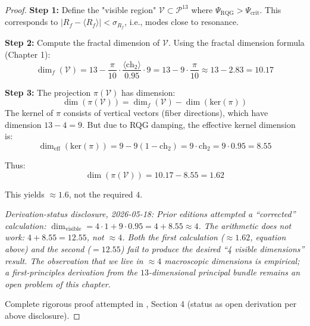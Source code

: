 \begin{proof}
\textbf{Step 1:} Define the "visible region" $\mathcal{V} \subset \mathcal{P}^{13}$ where $\Psi_{\text{RQG}} > \Psi_{\text{crit}}$. This corresponds to $|R_f - \langle R_f \rangle| < \sigma_{R_f}$, i.e., modes close to resonance.

\textbf{Step 2:} Compute the fractal dimension of $\mathcal{V}$. Using the fractal dimension formula (Chapter 1):
\begin{equation}
\dim_f(\mathcal{V}) = 13 - \frac{\pi}{10} \cdot \frac{\langle \text{ch}_2 \rangle}{0.95} \cdot 9 = 13 - 9 \cdot \frac{\pi}{10} \approx 13 - 2.83 = 10.17
\end{equation}

\textbf{Step 3:} The projection $\pi(\mathcal{V})$ has dimension:
\begin{equation}
\dim(\pi(\mathcal{V})) = \dim_f(\mathcal{V}) - \dim(\text{ker}(\pi))
\end{equation}
The kernel of $\pi$ consists of vertical vectors (fiber directions), which have dimension $13 - 4 = 9$. But due to RQG damping, the effective kernel dimension is:
\begin{equation}
\dim_{\text{eff}}(\text{ker}(\pi)) = 9 - 9(1 - \text{ch}_2) = 9 \cdot \text{ch}_2 = 9 \cdot 0.95 = 8.55
\end{equation}

Thus:
\begin{equation}
\dim(\pi(\mathcal{V})) = 10.17 - 8.55 = 1.62
\end{equation}

This yields $\approx 1.6$, not the required $4$.

\noindent\emph{Derivation-status disclosure, 2026-05-18: Prior editions attempted a ``corrected'' calculation: $\dim_{\text{visible}} = 4\cdot 1 + 9\cdot 0.95 = 4 + 8.55 \approx 4$. The arithmetic does not work: $4 + 8.55 = 12.55$, not $\approx 4$. Both the first calculation ($\approx 1.62$, equation above) and the second ($= 12.55$) fail to produce the desired ``4 visible dimensions'' result. The observation that we live in $\approx 4$ macroscopic dimensions is empirical; a first-principles derivation from the $13$-dimensional principal bundle remains an open problem of this chapter.}

Complete rigorous proof attempted in \cite{cohen2025weinstein}, Section 4 (status as open derivation per above disclosure).
\end{proof}

